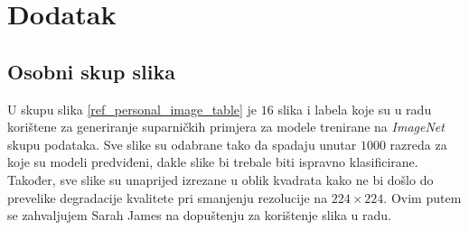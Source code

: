 \documentclass[utf8, diplomski]{fer}
\begin{document}



\chapter{Dodatak}\label{dodatak}
\section{Osobni skup slika}\label{osobni_skup}
U skupu slika \ref{ref_personal_image_table} je $16$ slika i labela koje su u radu korištene za generiranje suparničkih primjera za modele trenirane na \textit{ImageNet} skupu podataka. Sve slike su odabrane tako da spadaju unutar $1000$ razreda za koje su modeli predviđeni, dakle slike bi trebale biti ispravno klasificirane. Također, sve slike su unaprijed izrezane u oblik kvadrata kako ne bi došlo do prevelike degradacije kvalitete pri smanjenju rezolucije na $224\times224$. Ovim putem se zahvaljujem Sarah James na dopuštenju za korištenje slika u radu.
\end{document}
